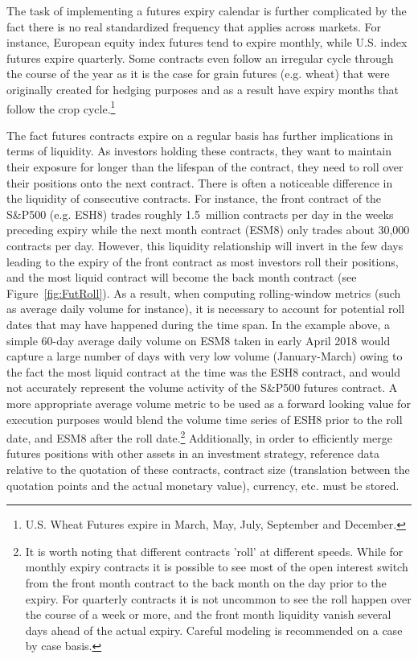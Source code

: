 \begin{itemize}
The task of implementing a futures expiry calendar is further complicated by the fact there is no real standardized frequency that applies across markets. For instance, European equity index futures tend to expire monthly, while U.S. index futures expire quarterly. Some contracts even follow an irregular cycle through the course of the year as it is the case for grain futures (e.g. wheat) that were originally created for hedging purposes and as a result have expiry months that follow the crop cycle.\footnote{U.S. Wheat Futures expire in March, May, July, September and December.}


The fact futures contracts expire on a regular basis has further implications in terms of liquidity. As investors holding these contracts, they want to maintain their exposure for longer than the lifespan of the contract, they need to roll over their positions onto the next contract. There is often a noticeable difference in the liquidity of consecutive contracts. For instance, the front contract of the S\&P500 (e.g. ESH8) trades roughly 1.5~million contracts per day in the weeks preceding expiry while the next month contract (ESM8) only trades about 30,000 contracts per day. However, this liquidity relationship will invert in the few days leading to the expiry of the front contract as most investors roll their positions, and the most liquid contract will become the back month contract (see Figure~\ref{fig:FutRoll}). As a result, when computing rolling-window metrics (such as average daily volume for instance), it is necessary to account for potential roll dates that may have happened during the time span. In the example above, a simple 60-day average daily volume on ESM8 taken in early April 2018 would capture a large number of days with very low volume (January-March) owing to the fact the most liquid contract at the time was the ESH8 contract, and would not accurately represent the volume activity of the S\&P500 futures contract. A more appropriate average volume metric to be used as a forward looking value for execution purposes would blend the volume time series of ESH8 prior to the roll date, and ESM8 after the roll date.\footnote{It is worth noting that different contracts 'roll' at different speeds. While for monthly expiry contracts it is possible to see most of the open interest switch from the front month contract to the back month on the day prior to the expiry. For quarterly contracts it is not uncommon to see the roll happen over the course of a week or more, and the front month liquidity vanish several days ahead of the actual expiry. Careful modeling is recommended on a case by case basis.} Additionally, in order to efficiently merge futures positions with other assets in an investment strategy, reference data relative to the quotation of these contracts, contract size (translation between the quotation points and the actual monetary value), currency, etc. must be stored.


\end{itemize}
